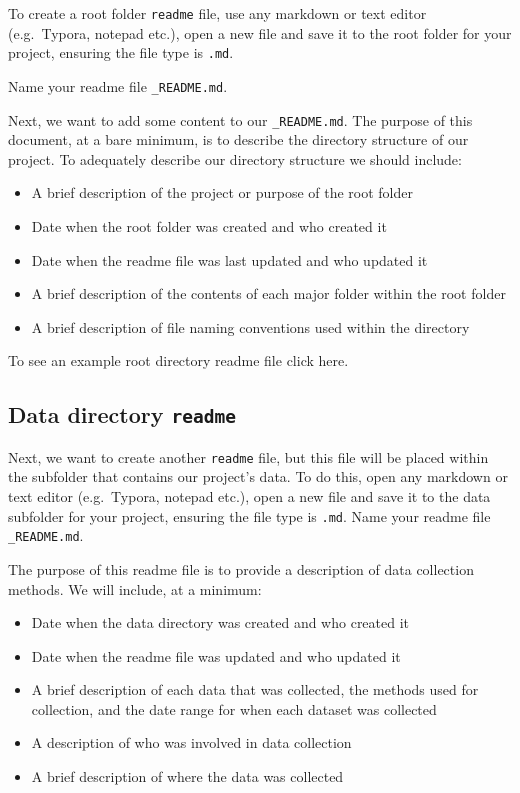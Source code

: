 \documentclass[
]{book}
\providecommand{\tightlist}{%
  \setlength{\itemsep}{0pt}\setlength{\parskip}{0pt}}
\begin{document}
To create a root folder \texttt{readme} file, use any markdown or text editor (e.g.~Typora, notepad etc.), open a new file and save it to the root folder for your project, ensuring the file type is \texttt{.md}.

Name your readme file \texttt{\_README.md}.

Next, we want to add some content to our \texttt{\_README.md}. The purpose of this document, at a bare minimum, is to describe the directory structure of our project. To adequately describe our directory structure we should include:

\begin{itemize}
\tightlist
\item
  A brief description of the project or purpose of the root folder
\item
  Date when the root folder was created and who created it
\item
  Date when the readme file was last updated and who updated it
\item
  A brief description of the contents of each major folder within the root folder
\item
  A brief description of file naming conventions used within the directory
\end{itemize}

To see an example root directory readme file click here.

\hypertarget{data-directory-readme}{%
\subsection*{\texorpdfstring{Data directory \texttt{readme}}{Data directory readme}}\label{data-directory-readme}}

Next, we want to create another \texttt{readme} file, but this file will be placed within the subfolder that contains our project's data. To do this, open any markdown or text editor (e.g.~Typora, notepad etc.), open a new file and save it to the data subfolder for your project, ensuring the file type is \texttt{.md}. Name your readme file \texttt{\_README.md}.

The purpose of this readme file is to provide a description of data collection methods. We will include, at a minimum:

\begin{itemize}
\tightlist
\item
  Date when the data directory was created and who created it
\item
  Date when the readme file was updated and who updated it
\item
  A brief description of each data that was collected, the methods used for collection, and the date range for when each dataset was collected
\item
  A description of who was involved in data collection
\item
  A brief description of where the data was collected
\end{itemize}
\end{document}
